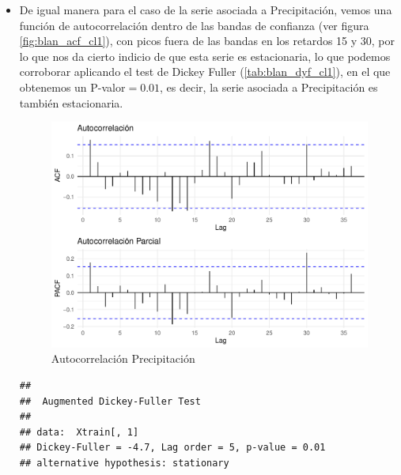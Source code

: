 \documentclass[12pt,oneside]{book}\usepackage[]{graphicx}\usepackage[]{color}
\makeatletter
\def\maxwidth{ %
  \ifdim\Gin@nat@width>\linewidth
    \linewidth
  \else
    \Gin@nat@width
  \fi
}
\newenvironment{kframe}{%
 \def\at@end@of@kframe{}%
 \ifinner\ifhmode%
  \def\at@end@of@kframe{\end{minipage}}%
  \begin{minipage}{\columnwidth}%
 \fi\fi%
 \def\FrameCommand##1{\hskip\@totalleftmargin \hskip-\fboxsep
 \colorbox{shadecolor}{##1}\hskip-\fboxsep
     \hskip-\linewidth \hskip-\@totalleftmargin \hskip\columnwidth}%
 \MakeFramed {\advance\hsize-\width
   \@totalleftmargin\z@ \linewidth\hsize
   \@setminipage}}%
 {\par\unskip\endMakeFramed%
 \at@end@of@kframe}
\newenvironment{knitrout}{}{} %
\theoremstyle{definition} %
\makeatother
\begin{document}
\begin{itemize}
\item De igual manera para el caso de la serie asociada a Precipitación, vemos una función de autocorrelación dentro de las bandas de confianza (ver figura \ref{fig:blan_acf_cl1}), con picos fuera de las bandas en los retardos 15 y 30, por lo que nos da cierto indicio de que esta serie es estacionaria, lo que podemos corroborar aplicando el test de Dickey Fuller (\ref{tab:blan_dyf_cl1}), en el que obtenemos un P-valor$=0.01$, es decir, la serie asociada a Precipitación es también estacionaria.



\begin{knitrout}
\color{fgcolor}\begin{figure}[H]

{\centering \includegraphics[width=\maxwidth]{figure/unnamed-chunk-25-1} 

}

\caption{\label{fig:blan_acf_cl1} Autocorrelación Precipitación}\label{fig:unnamed-chunk-25}
\end{figure}


\end{knitrout}


\begin{knitrout}
\color{fgcolor}\begin{kframe}
\begin{verbatim}
## 
## 	Augmented Dickey-Fuller Test
## 
## data:  Xtrain[, 1]
## Dickey-Fuller = -4.7, Lag order = 5, p-value = 0.01
## alternative hypothesis: stationary
\end{verbatim}
\end{kframe}
\end{knitrout}
\label{tab:blan_dyf_cl1}



\end{itemize}
\end{document}
